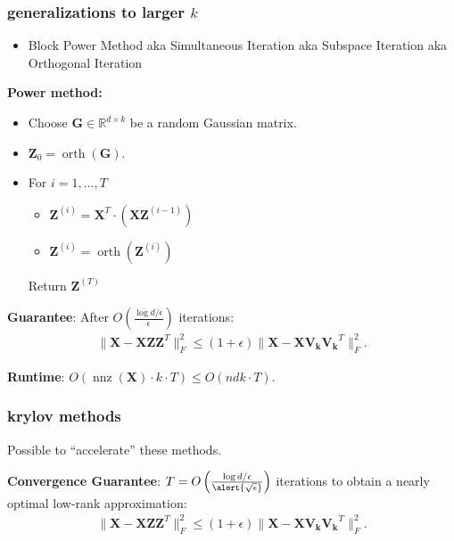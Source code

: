 \documentclass[compress]{beamer}
\newcommand{\bv}[1]{\mathbf{#1}}
\newcommand{\R}{\mathbb{R}}
\DeclareMathOperator{\nnz}{nnz}
\DeclareMathOperator{\orth}{orth}
\begin{document}
\begin{frame}[t]
	\frametitle{generalizations to larger $k$}
	\begin{itemize}
		\item Block Power Method aka Simultaneous Iteration aka Subspace Iteration aka Orthogonal Iteration
	\end{itemize}
	\textbf{Power method:}
\begin{itemize}
	\item Choose $\bv{G}\in \R^{d\times k}$ be a random Gaussian matrix. 
	\item $\bv{Z}_0 = \orth(\bv{G})$.
	\item For $i = 1,\ldots, T$
	\begin{itemize}
		\item $\bv{Z}^{(i)} = \bv{X}^T\cdot(\bv{X}\bv{Z}^{(i-1)} )$
		\item $\bv{Z}^{(i)}  = \orth(\bv{Z}^{(i)})$
	\end{itemize}
	Return $\bv{Z}^{(T)}$
\end{itemize}
	
	\begin{center}
		\alert{\textbf{Guarantee}:} After $O\left(\frac{\log d/\epsilon}{\epsilon}\right)$ iterations:
		\begin{align*}
			\|\bv{X} - \bv{X}\bv{Z}\bv{Z}^T\|_F^2 \leq (1+\epsilon)\|\bv{X} - \bv{X}\bv{V_k}\bv{V_k}^T\|_F^2.
		\end{align*}
	\end{center}
	\textbf{Runtime}: ${O}(\nnz(\bv{X})\cdot k \cdot T) \leq {O}(ndk \cdot T)$.
\end{frame}

\begin{frame}[t]
	\frametitle{krylov methods}
	Possible to ``accelerate'' these methods. 
	
	\begin{center}
		\alert{\textbf{Convergence Guarantee}:} $T = O\left(\frac{\log d/\epsilon}{\alert{\sqrt{\epsilon}}}\right)$ iterations to obtain a nearly optimal low-rank approximation:
		\begin{align*}
			\|\bv{X} - \bv{X}\bv{Z}\bv{Z}^T\|_F^2 \leq (1+\epsilon)\|\bv{X} - \bv{X}\bv{V_k}\bv{V_k}^T\|_F^2.
		\end{align*}
		
	\end{center}
\end{frame}
\end{document}

